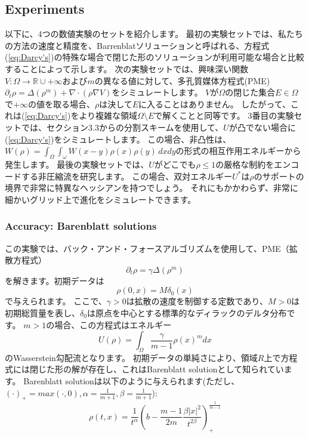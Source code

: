 \documentclass{jsarticle}
\theoremstyle{definition}
\begin{document}
\subsection{Experiments}
以下に、4つの数値実験のセットを紹介します。
最初の実験セットでは、私たちの方法の速度と精度を、Barrenblatソリューションと呼ばれる、方程式(\ref{eq:Darcy's})の特殊な場合で閉じた形のソリューションが利用可能な場合と比較することによって示します。
次の実験セットでは、興味深い関数$V: \Omega \to \mathbb{R} \cup {+ \infty}$および$m$の異なる値に対して、多孔質媒体方程式(PME)$\partial_t \rho = \Delta (\rho^m) + \nabla \cdot (\rho \nabla V)$をシミュレートします。
$V$が$\Omega$の閉じた集合$E \in \Omega$で$+ \infty$の値を取る場合、$\rho$は決して$E$に入ることはありません。
したがって、これは(\ref{eq:Darcy's})をより複雑な領域$\Omega \setminus  E$で解くことと同等です。
3番目の実験セットでは、セクション3.3からの分割スキームを使用して、$U$が凸でない場合に(\ref{eq:Darcy's})をシミュレートします。
この場合、非凸性は、$W(\rho) = \int_\Omega \int_\omega W(x - y) \rho(x)\rho(y) \,dx dy$の形式の相互作用エネルギーから発生します。
最後の実験セットでは、$U$がどこでも$\rho \le 1$の厳格な制約をエンコードする非圧縮流を研究します。
この場合、双対エネルギー$U^*$は$\rho$のサポートの境界で非常に特異なヘッシアンを持つでしょう。
それにもかかわらず、非常に細かいグリッド上で進化をシミュレートできます。





\subsubsection{Accuracy: Barenblatt solutions}


この実験では、バック・アンド・フォースアルゴリズムを使用して、PME（拡散方程式）
\begin{equation}
    \label{eq:PME}
    \partial_t\rho = \gamma\Delta(\rho^m)
\end{equation}
を解きます。初期データは
\[
    \rho(0,x) = M\delta_0(x)
\]
で与えられます。
ここで、\(\gamma > 0\)は拡散の速度を制御する定数であり、\(M > 0\)は初期総質量を表し、\(\delta_0\)は原点を中心とする標準的なディラックのデルタ分布です。
\(m > 1\)の場合、この方程式はエネルギー
\[
    U(\rho) = \int_\Omega \frac{\gamma}{m - 1}\rho(x)^m dx
\]
のWasserstein勾配流となります。
初期データの単純さにより、領域\(R\)上で方程式には閉じた形の解が存在し、これはBarenblatt solutionとして知られています。
Barenblatt solutionは以下のように与えられます(ただし、$(\cdot)_+ = max(\cdot, 0), \alpha = \frac{1}{m + 1}, \beta = \frac{1}{m + 1}$):
\[
    \rho(t,x)= \frac{1}{t^\alpha}\left(b - \frac{m - 1}{2m}\frac{\beta |x|^2}{t^{2\beta}} \right)_+^{\frac{1}{m - 1}}
\]
\end{document}
